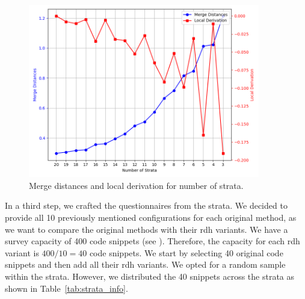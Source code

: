 \documentclass[%
class=scrreprt,
chapterprefix=false,%
open=right,%
twoside=false,%
paper=a4,%
logofile={Logo\_zentral\_farbig\_EN.png},%
thesistype=master,%
UKenglish,%
]{se2thesis}
\theoremstyle{definition}
\begin{document}
	\begin{figure}[tb]
		\centering
		\includegraphics[width=0.9\textwidth]{img/strata_merge_distances.png}
		\caption{Merge distances and local derivation for number of strata.} 
		\label{fig:strata_merge_distances}
	\end{figure}
	
		
	In a third step, we crafted the questionnaires from the strata. We decided to provide all 10 previously mentioned configurations for each original method, as we want to compare the original methods with their rdh variants. We have a survey capacity of 400 code snippets (see ). Therefore, the capacity for each rdh variant is $400/10 = 40$ code snippets. We start by selecting 40 original code snippets and then add all their rdh variants.
	We opted for a random sample within the strata. However, we distributed the 40 snippets across the strata as shown in Table~\ref{tab:strata_info}.
	
\end{document}
